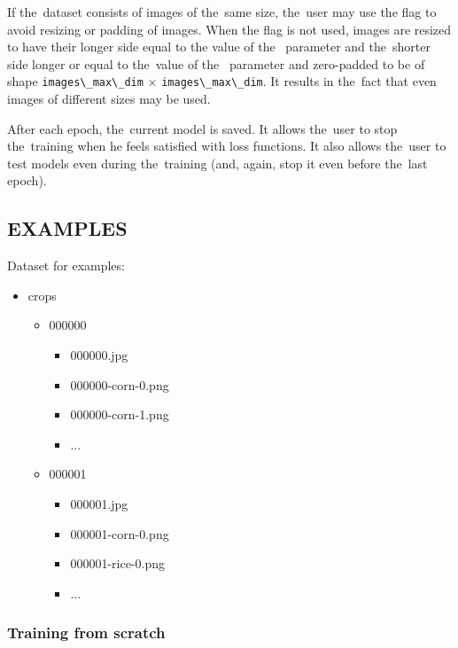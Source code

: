 If the~dataset consists of images of the~same size, the~user may use the
 flag to avoid resizing or padding of images. When the
flag is not used, images are resized to have their longer side equal to the
value of the~ parameter and the~shorter
side longer or equal to the~value of the~
parameter and zero-padded to be of shape \verb|images\_max\_dim| $\times$
\verb|images\_max\_dim|. It results in the~fact that even images of different
sizes may be used. 

After each epoch, the~current model is saved. It allows the~user to stop
the~training when he feels satisfied with loss functions. It also allows
the~user to test models even during the~training (and, again, stop it even
before the~last epoch). 

\subsection*{EXAMPLES}
Dataset for examples: 

\liststyleLii
\begin{itemize}
\item crops 

\begin{itemize}
\item 000000 

\begin{itemize}
\item 000000.jpg 
\item 000000-corn-0.png 
\item 000000-corn-1.png 
\item ... 
\end{itemize}
\item 000001 

\begin{itemize}
\item 000001.jpg 
\item 000001-corn-0.png 
\item 000001-rice-0.png 
\item ... 
\end{itemize}
\end{itemize}
\end{itemize}

\subsubsection*{Training from scratch}

